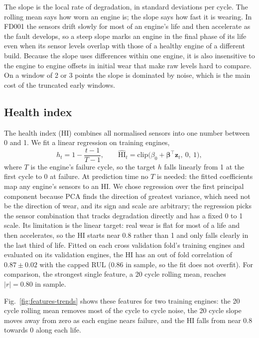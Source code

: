 The slope is the local rate of degradation, in standard deviations per
cycle. The rolling mean says how worn an engine is; the slope says how fast
it is wearing. In FD001 the sensors drift slowly for most of an engine's
life and then accelerate as the fault develops, so a steep slope marks an
engine in the final phase of its life even when its sensor levels overlap
with those of a healthy engine of a different build. Because the slope uses
differences within one engine, it is also insensitive to the engine to
engine offsets in initial wear that make raw levels hard to compare. On a
window of 2 or 3 points the slope is dominated by noise, which is the main
cost of the truncated early windows.

\subsection{Health index}
The health index (HI) combines all normalised sensors into one number
between 0 and 1. We fit a linear regression on training engines,
\begin{equation}
h_t = 1 - \frac{t - 1}{T - 1}, \qquad
\widehat{\mathrm{HI}}_t = \mathrm{clip}\bigl(\beta_0 + \boldsymbol\beta^\top
\mathbf{z}_t,\ 0,\ 1\bigr),
\end{equation}
where $T$ is the engine's failure cycle, so the target $h$ falls linearly
from 1 at the first cycle to 0 at failure. At prediction time no $T$ is
needed: the fitted coefficients map any engine's sensors to an HI. We chose
regression over the first principal component because PCA finds the
direction of greatest variance, which need not be the direction of wear,
and its sign and scale are arbitrary; the regression picks the sensor
combination that tracks degradation directly and has a fixed 0 to 1 scale.
Its limitation is the linear target: real wear is flat for most of a life
and then accelerates, so the HI starts near 0.8 rather than 1 and only
falls clearly in the last third of life. Fitted on each cross validation
fold's training engines and evaluated on its validation engines, the HI has
an out of fold correlation of $0.87 \pm 0.02$ with the capped RUL (0.86 in
sample, so the fit does not overfit). For comparison, the strongest single
feature, a 20 cycle rolling mean, reaches $|r| = 0.80$ in sample.

Fig.~\ref{fig:features-trends} shows these features for two training
engines: the 20 cycle rolling mean removes most of the cycle to cycle
noise, the 20 cycle slope moves away from zero as each engine nears
failure, and the HI falls from near 0.8 towards 0 along each life.


